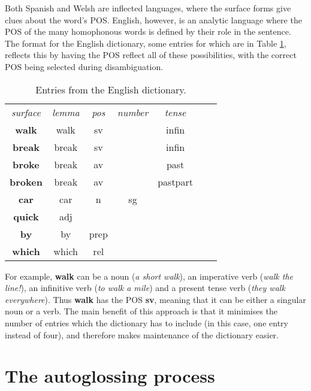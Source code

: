 \documentclass[11pt]{article}
\begin{document}
Both Spanish and Welsh are inflected languages, where the surface forms give clues about the word's POS.  English, however, is an analytic language where the POS of the many homophonous words is defined by their role in the sentence.  The format for the English dictionary, some entries for which are in Table \ref{english_dict}, reflects this by having the POS reflect all of these possibilities, with the correct POS being selected during disambiguation.  

\begin{table}[!hbtp]
\centering
\begin{scriptsize}
\begin{tabular}{ccccccc}
\textit{surface} & \textit{lemma} & \textit{pos} & \textit{number} & \textit{tense} \\
\textbf{walk} & walk & sv & & infin \\
\textbf{break} & break & sv & & infin \\
\textbf{broke} & break & av & & past \\
\textbf{broken} & break & av & & pastpart \\
\textbf{car} & car & n & sg & \\
\textbf{quick} & adj & & & \\
\textbf{by} & by & prep & & \\
\textbf{which} & which & rel & & \\
\end{tabular}
\end{scriptsize}
\caption{Entries from the English dictionary.}
\label{english_dict}
\end{table}

For example, \textbf{walk} can be a noun (\textit{a short walk}), an imperative verb (\textit{walk the line!}), an infinitive verb (\textit{to walk a mile}) and a present tense verb (\textit{they walk everywhere}).  Thus \textbf{walk} has the POS \textbf{sv}, meaning that it can be either a singular noun or a verb. The main benefit of this approach is that it minimises the number of entries which the dictionary has to include (in this case, one entry instead of four), and therefore makes maintenance of the dictionary easier.


\section{The autoglossing process}
\label{sec:autoglosser}
\end{document}
